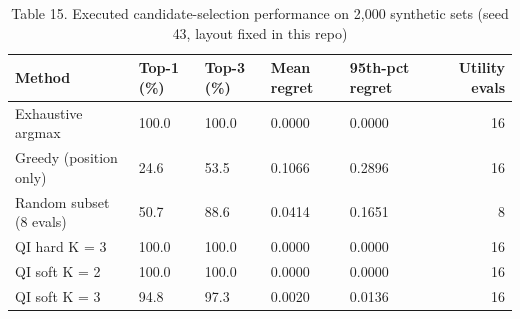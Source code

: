 \begin{table}
\caption{Table 15. Executed candidate-selection performance on 2,000 synthetic sets (seed 43, layout fixed in this repo)}
\label{tab:table15}
\begin{tabular}{lllllr}
\toprule
Method & Top-1 (\%) & Top-3 (\%) & Mean regret & 95th-pct regret & Utility evals \\
\midrule
Exhaustive argmax & 100.0 & 100.0 & 0.0000 & 0.0000 & 16 \\
Greedy (position only) & 24.6 & 53.5 & 0.1066 & 0.2896 & 16 \\
Random subset (8 evals) & 50.7 & 88.6 & 0.0414 & 0.1651 & 8 \\
QI hard K = 3 & 100.0 & 100.0 & 0.0000 & 0.0000 & 16 \\
QI soft K = 2 & 100.0 & 100.0 & 0.0000 & 0.0000 & 16 \\
QI soft K = 3 & 94.8 & 97.3 & 0.0020 & 0.0136 & 16 \\
\bottomrule
\end{tabular}
\end{table}

